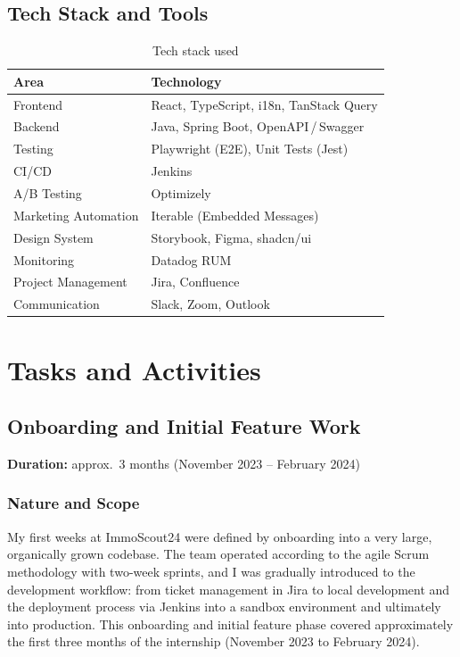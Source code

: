 \documentclass[a4paper, 12pt]{article}
\let\oldsection\section
\renewcommand{\section}{\clearpage\oldsection}
\begin{document}
\subsection{Tech Stack and Tools}

\begin{table}[H]
  \centering
  \begin{tabularx}{\textwidth}{lX}
    \toprule
    \textbf{Area} & \textbf{Technology} \\
    \midrule
    Frontend             & React, TypeScript, i18n, TanStack Query \\
    Backend              & Java, Spring Boot, OpenAPI\,/\,Swagger \\
    Testing              & Playwright (E2E), Unit Tests (Jest) \\
    CI/CD                & Jenkins \\
    A/B Testing          & Optimizely \\
    Marketing Automation & Iterable (Embedded Messages) \\
    Design System        & Storybook, Figma, shadcn/ui \\
    Monitoring           & Datadog RUM \\
    Project Management   & Jira, Confluence \\
    Communication        & Slack, Zoom, Outlook \\
    \bottomrule
  \end{tabularx}
  \caption{Tech stack used}
\end{table}


\section{Tasks and Activities}

\subsection{Onboarding and Initial Feature Work}

\noindent\textbf{Duration:} approx.\ 3 months (November 2023 -- February 2024)

\subsubsection*{Nature and Scope}

My first weeks at ImmoScout24 were defined by onboarding into a very large, organically
grown codebase. The team operated according to the agile Scrum methodology with
two-week sprints, and I was gradually introduced to the development workflow: from
ticket management in Jira to local development and the deployment process via Jenkins
into a sandbox environment and ultimately into production. This onboarding and initial
feature phase covered approximately the first three months of the internship
(November 2023 to February 2024).
\end{document}
